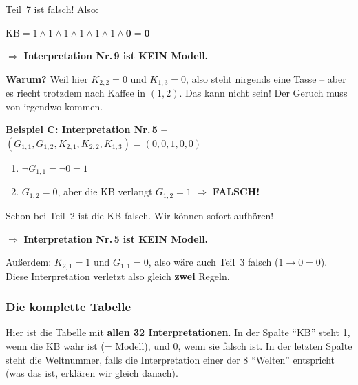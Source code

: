 \documentclass[a4paper,12pt]{article}
\begin{document}
Teil~7 ist falsch! Also:

$\text{KB} = 1 \wedge 1 \wedge 1 \wedge 1 \wedge 1 \wedge 1 \wedge \mathbf{0} = \mathbf{0}$

$\Rightarrow$ \textbf{Interpretation Nr.\,9 ist KEIN Modell.}

\textbf{Warum?} Weil hier $K_{2,2} = 0$ und $K_{1,3} = 0$, also steht nirgends eine Tasse -- aber es riecht trotzdem nach Kaffee in $(1{,}2)$. Das kann nicht sein! Der Geruch muss von irgendwo kommen.

\bigskip
\textbf{Beispiel C: Interpretation Nr.\,5 -- $(G_{1,1}, G_{1,2}, K_{2,1}, K_{2,2}, K_{1,3}) = (0, 0, 1, 0, 0)$}

\begin{enumerate}
\item $\neg G_{1,1} = \neg 0 = 1$ \checkmark
\item $G_{1,2} = 0$, aber die KB verlangt $G_{1,2} = 1$ $\Rightarrow$ \textbf{FALSCH!}
\end{enumerate}

Schon bei Teil~2 ist die KB falsch. Wir k\"onnen sofort aufh\"oren!

$\Rightarrow$ \textbf{Interpretation Nr.\,5 ist KEIN Modell.}

Au\ss erdem: $K_{2,1} = 1$ und $G_{1,1} = 0$, also w\"are auch Teil~3 falsch ($1 \to 0 = 0$). Diese Interpretation verletzt also gleich \textbf{zwei} Regeln.

\subsubsection*{Die komplette Tabelle}

Hier ist die Tabelle mit \textbf{allen 32 Interpretationen}. In der Spalte "`KB"' steht 1, wenn die KB wahr ist (= Modell), und 0, wenn sie falsch ist. In der letzten Spalte steht die Weltnummer, falls die Interpretation einer der 8 "`Welten"' entspricht (was das ist, erkl\"aren wir gleich danach).
\end{document}
